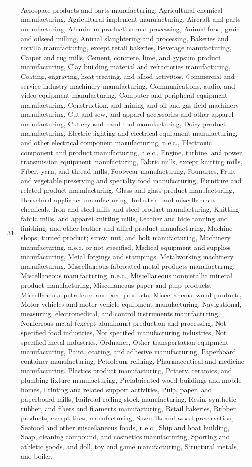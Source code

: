 \begin{longtable}{lp{18cm}}
  31 & Aerospace products and parts manufacturing, Agricultural chemical manufacturing, Agricultural implement manufacturing, Aircraft and parts manufacturing, Aluminum production and processing, Animal food, grain and oilseed milling, Animal slaughtering and processing, Bakeries and tortilla manufacturing, except retail bakeries, Beverage manufacturing, Carpet and rug mills, Cement, concrete, lime, and gypsum product manufacturing, Clay building material and refractories manufacturing, Coating, engraving, heat treating, and allied activities, Commercial and service industry machinery manufacturing, Communications, audio, and video equipment manufacturing, Computer and peripheral equipment manufacturing, Construction, and mining and oil and gas field machinery manufacturing, Cut and sew, and apparel accessories and other apparel manufacturing, Cutlery and hand tool manufacturing, Dairy product manufacturing, Electric lighting and electrical equipment manufacturing, and other electrical component manufacturing, n.e.c., Electronic component and product manufacturing, n.e.c., Engine, turbine, and power transmission equipment manufacturing, Fabric mills, except knitting mills, Fiber, yarn, and thread mills, Footwear manufacturing, Foundries, Fruit and vegetable preserving and specialty food manufacturing, Furniture and related product manufacturing, Glass and glass product manufacturing, Household appliance manufacturing, Industrial and miscellaneous chemicals, Iron and steel mills and steel product manufacturing, Knitting fabric mills, and apparel knitting mills, Leather and hide tanning and finishing, and other leather and allied product manufacturing, Machine shops; turned product; screw, nut, and bolt manufacturing, Machinery manufacturing, n.e.c. or not specified, Medical equipment and supplies manufacturing, Metal forgings and stampings, Metalworking machinery manufacturing, Miscellaneous fabricated metal products manufacturing, Miscellaneous manufacturing, n.e.c., Miscellaneous nonmetallic mineral product manufacturing, Miscellaneous paper and pulp products, Miscellaneous petroleum and coal products, Miscellaneous wood products, Motor vehicles and motor vehicle equipment manufacturing, Navigational, measuring, electromedical, and control instruments manufacturing, Nonferrous metal (except aluminum) production and processing, Not specified food industries, Not specified manufacturing industries, Not specified metal industries, Ordnance, Other transportation equipment manufacturing, Paint, coating, and adhesive manufacturing, Paperboard container manufacturing, Petroleum refining, Pharmaceutical and medicine manufacturing, Plastics product manufacturing, Pottery, ceramics, and plumbing fixture manufacturing, Prefabricated wood buildings and mobile homes, Printing and related support activities, Pulp, paper, and paperboard mills, Railroad rolling stock manufacturing, Resin, synthetic rubber, and fibers and filaments manufacturing, Retail bakeries, Rubber products, except tires, manufacturing, Sawmills and wood preservation, Seafood and other miscellaneous foods, n.e.c., Ship and boat building, Soap, cleaning compound, and cosmetics manufacturing, Sporting and athletic goods, and doll, toy and game manufacturing, Structural metals, and boiler, 
\end{longtable}
